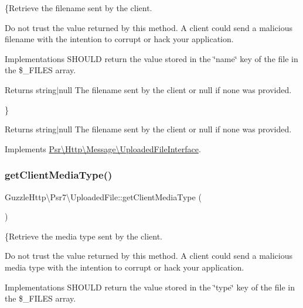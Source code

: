 \{Retrieve the filename sent by the client.

Do not trust the value returned by this method. A client could send a malicious filename with the intention to corrupt or hack your application.

Implementations S\+H\+O\+U\+LD return the value stored in the \char`\"{}name\char`\"{} key of the file in the \$\+\_\+\+F\+I\+L\+ES array.

\begin{DoxyReturn}{Returns}
string$\vert$null The filename sent by the client or null if none was provided.
\end{DoxyReturn}
\}

\begin{DoxyReturn}{Returns}
string$\vert$null The filename sent by the client or null if none was provided. 
\end{DoxyReturn}


Implements \hyperlink{interfacePsr_1_1Http_1_1Message_1_1UploadedFileInterface_ac303b01505ed2b5fb175ff81fbde666d}{Psr\textbackslash{}\+Http\textbackslash{}\+Message\textbackslash{}\+Uploaded\+File\+Interface}.

\mbox{\label{classGuzzleHttp_1_1Psr7_1_1UploadedFile_af579a9f2b8a3867da29466cfbad22a4e}} 
\subsubsection{\texorpdfstring{get\+Client\+Media\+Type()}{getClientMediaType()}}
{\footnotesize\ttfamily Guzzle\+Http\textbackslash{}\+Psr7\textbackslash{}\+Uploaded\+File\+::get\+Client\+Media\+Type (\begin{DoxyParamCaption}{ }\end{DoxyParamCaption})}

\{Retrieve the media type sent by the client.

Do not trust the value returned by this method. A client could send a malicious media type with the intention to corrupt or hack your application.

Implementations S\+H\+O\+U\+LD return the value stored in the \char`\"{}type\char`\"{} key of the file in the \$\+\_\+\+F\+I\+L\+ES array.

